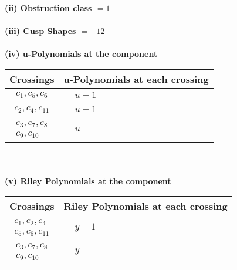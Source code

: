 \documentclass[1p]{elsarticle_modified}
\theoremstyle{definition}
\begin{document}
\flushleft \textbf{(ii) Obstruction class $= 1$}\\~\\
\flushleft \textbf{(iii) Cusp Shapes $= -12$}\\~\\
\newpage\renewcommand{\arraystretch}{1}
\flushleft \textbf{(iv) u-Polynomials at the component}\newline \\
\begin{tabular}{m{50pt}|m{274pt}}
Crossings & \hspace{64pt}u-Polynomials at each crossing \\
\hline $$\begin{aligned}c_{1},c_{5},c_{6}\end{aligned}$$&$\begin{aligned}
&u-1
\end{aligned}$\\
\hline $$\begin{aligned}c_{2},c_{4},c_{11}\end{aligned}$$&$\begin{aligned}
&u+1
\end{aligned}$\\
\hline $$\begin{aligned}c_{3},c_{7},c_{8}\\c_{9},c_{10}\end{aligned}$$&$\begin{aligned}
&u
\end{aligned}$\\
\hline
\end{tabular}\\~\\
\newpage\renewcommand{\arraystretch}{1}
\flushleft \textbf{(v) Riley Polynomials at the component}\newline \\
\begin{tabular}{m{50pt}|m{274pt}}
Crossings & \hspace{64pt}Riley Polynomials at each crossing \\
\hline $$\begin{aligned}c_{1},c_{2},c_{4}\\c_{5},c_{6},c_{11}\end{aligned}$$&$\begin{aligned}
&y-1
\end{aligned}$\\
\hline $$\begin{aligned}c_{3},c_{7},c_{8}\\c_{9},c_{10}\end{aligned}$$&$\begin{aligned}
&y
\end{aligned}$\\
\hline
\end{tabular}\\~\\
\end{document}
